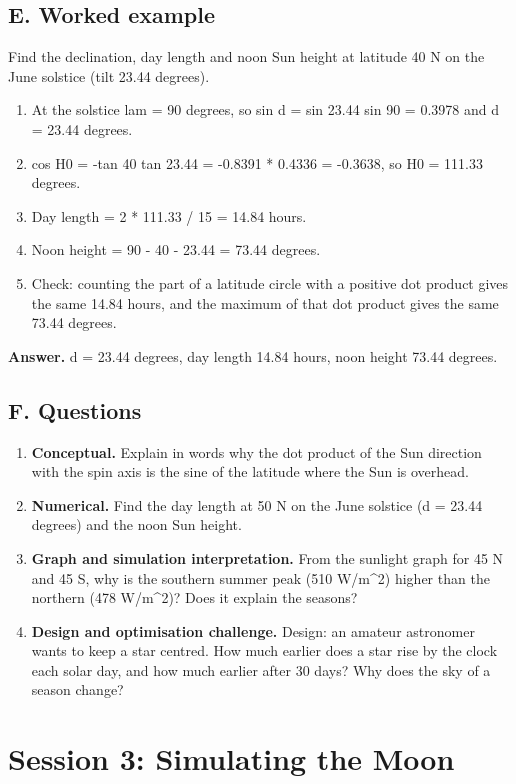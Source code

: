 \documentclass[11pt,a4paper]{article}
\begin{document}
\subsection*{E. Worked example}
Find the declination, day length and noon Sun height at latitude 40 N on the June solstice (tilt 23.44 degrees).
\begin{enumerate}[nosep]
\item At the solstice lam = 90 degrees, so sin d = sin 23.44 sin 90 = 0.3978 and d = 23.44 degrees.
\item cos H0 = -tan 40 tan 23.44 = -0.8391 * 0.4336 = -0.3638, so H0 = 111.33 degrees.
\item Day length = 2 * 111.33 / 15 = 14.84 hours.
\item Noon height = 90 - \textbar{}40 - 23.44\textbar{} = 73.44 degrees.
\item Check: counting the part of a latitude circle with a positive dot product gives the same 14.84 hours, and the maximum of that dot product gives the same 73.44 degrees.
\end{enumerate}
\textbf{Answer.} d = 23.44 degrees, day length 14.84 hours, noon height 73.44 degrees.

\subsection*{F. Questions}
\begin{enumerate}[nosep]
\item \textbf{Conceptual.} Explain in words why the dot product of the Sun direction with the spin axis is the sine of the latitude where the Sun is overhead.
\item \textbf{Numerical.} Find the day length at 50 N on the June solstice (d = 23.44 degrees) and the noon Sun height.
\item \textbf{Graph and simulation interpretation.} From the sunlight graph for 45 N and 45 S, why is the southern summer peak (510 W/m\textasciicircum{}2) higher than the northern (478 W/m\textasciicircum{}2)? Does it explain the seasons?
\item \textbf{Design and optimisation challenge.} Design: an amateur astronomer wants to keep a star centred. How much earlier does a star rise by the clock each solar day, and how much earlier after 30 days? Why does the sky of a season change?
\end{enumerate}

\section{Session 3: Simulating the Moon}
\end{document}
